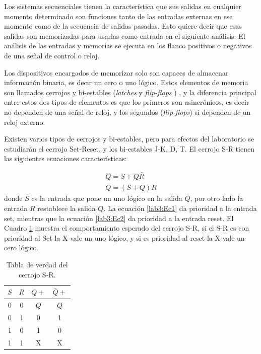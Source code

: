  Los sistemas secuenciales tienen la característica que sus salidas en cualquier momento determinado son funciones tanto de las entradas externas en ese momento como de la secuencia de salidas pasadas. Esto quiere decir que esas salidas son memorizadas para usarlas como entrada en el siguiente análisis. El análisis de las entradas y memorias se ejecuta en los flanco positivos o negativos de una señal de control o reloj.
 
 Los dispositivos encargados de memorizar solo son capaces de almacenar información binaria, es decir un cero o uno lógico. Estos elementos de memoria son llamados cerrojos y bi-estables (\textit{latches} y \textit{flip-flops} ) , y la diferencia principal entre estos dos tipos de elementos es que los primeros son asincrónicos, es decir no dependen de una señal de reloj, y los segundos (\textit{flip-flops}) si dependen de un reloj externo. 

Existen varios tipos de cerrojos y bi-estables, pero para efectos del laboratorio se estudiarán el cerrojo Set-Reset, y los bi-estables J-K, D, T. El cerrojo S-R tienen las siguientes ecuaciones características:

\begin{eqnarray}
\label{lab3:Ec1}
Q=S+Q\bar{R} \\ \label{lab3:Ec2}
Q=(S+Q)\bar{R}
\end{eqnarray}
donde $S$ es la entrada que pone un uno lógico en la salida $Q$, por otro lado la entrada $R$ restablece la salida $Q$. La ecuación \eqref{lab3:Ec1} da prioridad a la entrada set, mientras que la ecuación \eqref{lab3:Ec2} da prioridad a la entrada reset. El Cuadro \ref{tab:SR} muestra el comportamiento esperado del cerrojo S-R, si el S-R es con prioridad al Set la X vale un uno lógico, y si es prioridad al reset la X vale un cero lógico. 

\begin{table}
	\centering
	\caption{Tabla de verdad del cerrojo S-R.}
	\label{tab:SR}
	\begin{tabular}{|c|c|c|c|}
		
		\hline 
		$S$ 	& $R$  & $Q+$  & $\bar{Q}+$  \\
		\hline 
		0	& 0 &	$Q$	&	$Q$		\\ 
		
		0	& 1&	0	&	1	\\ 
		
		1	& 0 &	1	&	0	\\ 
			
		1	& 1 &	X	&	X	\\ 	
		\hline 
	\end{tabular} 
\end{table} 

